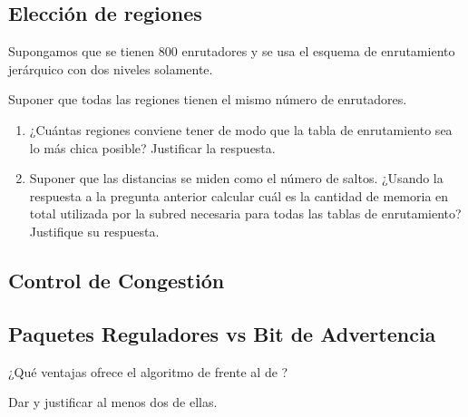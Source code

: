 \documentclass[12pt]{report}
\begin{document}
\begin{exer}
\subsection{Elección de regiones \stwo \shard}
Supongamos que se tienen 800 enrutadores y se usa el esquema de enrutamiento jerárquico con dos niveles solamente.

Suponer que todas las regiones tienen el mismo número de enrutadores.

\begin{enumerate}
\item ¿Cuántas regiones conviene tener de modo que la tabla de enrutamiento sea lo más chica posible? Justificar la respuesta.
\subitem {}
\subitem {}
\subitem {}
\item Suponer que las distancias se miden como el número de saltos. ¿Usando la
respuesta a la pregunta anterior calcular cuál es la cantidad de memoria en total
utilizada por la subred necesaria para todas las tablas de enrutamiento?
Justifique su respuesta. 
\end{enumerate}
\end{exer}

\begin{exer}
\section{Control de Congestión}
\subsection{Paquetes Reguladores vs Bit de Advertencia \stwo \steo}
¿Qué ventajas ofrece el algoritmo de  frente al de ?

Dar y justificar al menos dos de ellas.
\end{exer}
\end{document}
